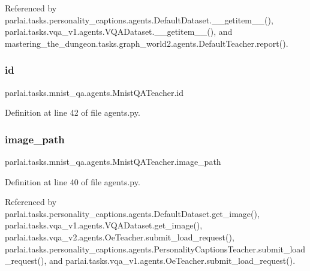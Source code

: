 Referenced by parlai.\+tasks.\+personality\+\_\+captions.\+agents.\+Default\+Dataset.\+\_\+\+\_\+getitem\+\_\+\+\_\+(), parlai.\+tasks.\+vqa\+\_\+v1.\+agents.\+V\+Q\+A\+Dataset.\+\_\+\+\_\+getitem\+\_\+\+\_\+(), and mastering\+\_\+the\+\_\+dungeon.\+tasks.\+graph\+\_\+world2.\+agents.\+Default\+Teacher.\+report().

\mbox{\label{classparlai_1_1tasks_1_1mnist__qa_1_1agents_1_1MnistQATeacher_a5f5642ab4593624e0f9a0a633deebf40}} 
\subsubsection{\texorpdfstring{id}{id}}
{\footnotesize\ttfamily parlai.\+tasks.\+mnist\+\_\+qa.\+agents.\+Mnist\+Q\+A\+Teacher.\+id}



Definition at line 42 of file agents.\+py.

\mbox{\label{classparlai_1_1tasks_1_1mnist__qa_1_1agents_1_1MnistQATeacher_a7c93f12d922a5f35699379983acfd5f0}} 
\subsubsection{\texorpdfstring{image\+\_\+path}{image\_path}}
{\footnotesize\ttfamily parlai.\+tasks.\+mnist\+\_\+qa.\+agents.\+Mnist\+Q\+A\+Teacher.\+image\+\_\+path}



Definition at line 40 of file agents.\+py.



Referenced by parlai.\+tasks.\+personality\+\_\+captions.\+agents.\+Default\+Dataset.\+get\+\_\+image(), parlai.\+tasks.\+vqa\+\_\+v1.\+agents.\+V\+Q\+A\+Dataset.\+get\+\_\+image(), parlai.\+tasks.\+vqa\+\_\+v2.\+agents.\+Oe\+Teacher.\+submit\+\_\+load\+\_\+request(), parlai.\+tasks.\+personality\+\_\+captions.\+agents.\+Personality\+Captions\+Teacher.\+submit\+\_\+load\+\_\+request(), and parlai.\+tasks.\+vqa\+\_\+v1.\+agents.\+Oe\+Teacher.\+submit\+\_\+load\+\_\+request().

